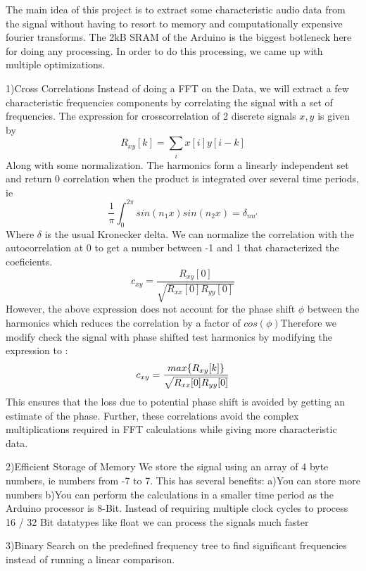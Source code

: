 
The main idea of this project is to extract some characteristic audio data from the signal without having to resort to memory and computationally expensive fourier transforms. The 2kB SRAM of the Arduino is the biggest botleneck here for doing any processing. In order to do this processing, we came up with multiple optimizations. 

1)Cross Correlations 
Instead of doing a FFT on the Data, we will extract a few characteristic frequencies components by correlating the signal with a set of frequencies. The expression for crosscorrelation of 2 discrete signals \(x,y\) is given by 
\begin{equation}
    R_{xy}[k] = \sum_{i} x[i]y[i-k]
\end{equation}
Along with some normalization. The harmonics form a linearly independent set and return 0 correlation when the product is integrated over several time periods, ie 
\begin{equation}
    \frac{1}{\pi} \int_0^{2\pi}sin(n_1x)sin(n_2x) = \delta_{nn'}  
\end{equation} 
Where \(\delta\) is the usual Kronecker delta. We can normalize the correlation with the autocorrelation at 0 to get a number between -1 and 1 that characterized the coeficients.
\begin{equation}
    c_{xy} = \frac{R_{xy}[0]}{\sqrt{R_{xx}[0]R_{yy}[0]} }
\end{equation} 
However, the above expression does not account for the phase shift \(\phi\) between the harmonics which reduces the correlation by a factor of \(cos(\phi)\)Therefore we modify check the signal with phase shifted test harmonics by modifying the expression to :
\begin{equation}
    c_{xy} = \frac{\mathnormal{max}\{R_{xy}[k]\}}{\sqrt{R_{xx}[0]R_{yy}[0]} }
\end{equation}
This ensures that the loss due to potential phase shift is avoided by getting an estimate of the phase. 
Further, these correlations avoid the complex multiplications required in FFT calculations while giving more characteristic data. 

2)Efficient Storage of Memory
We store the signal using an array of 4 byte numbers, ie numbers from -7 to 7. This has several benefits: 
a)You can store more numbers 
b)You can perform the calculations in a smaller time period as the Arduino processor is 8-Bit. Instead of requiring multiple clock cycles to process 16 / 32 Bit datatypes like float we can process the signals much faster 

3)Binary Search on the predefined frequency tree to find significant frequencies instead of running a linear comparison. 